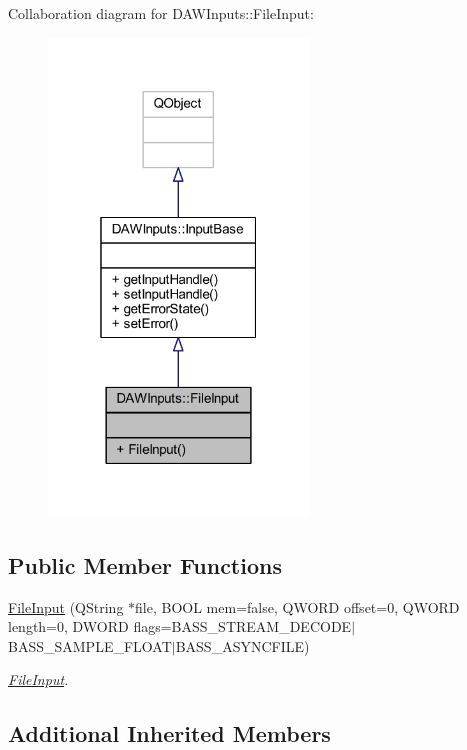 Collaboration diagram for D\-A\-W\-Inputs\-:\-:File\-Input\-:
\nopagebreak
\begin{figure}[H]
\begin{center}
\leavevmode
\includegraphics[width=196pt]{class_d_a_w_inputs_1_1_file_input__coll__graph}
\end{center}
\end{figure}
\subsection*{Public Member Functions}
\begin{DoxyCompactItemize}
\item 
\hyperlink{class_d_a_w_inputs_1_1_file_input_a5a18fa8381fb317541c12ca49d0d1a29_a5a18fa8381fb317541c12ca49d0d1a29}{File\-Input} (Q\-String $\ast$file, B\-O\-O\-L mem=false, Q\-W\-O\-R\-D offset=0, Q\-W\-O\-R\-D length=0, D\-W\-O\-R\-D flags=B\-A\-S\-S\-\_\-\-S\-T\-R\-E\-A\-M\-\_\-\-D\-E\-C\-O\-D\-E$|$B\-A\-S\-S\-\_\-\-S\-A\-M\-P\-L\-E\-\_\-\-F\-L\-O\-A\-T$|$B\-A\-S\-S\-\_\-\-A\-S\-Y\-N\-C\-F\-I\-L\-E)
\begin{DoxyCompactList}\small\item\em \hyperlink{class_d_a_w_inputs_1_1_file_input}{File\-Input}. \end{DoxyCompactList}\end{DoxyCompactItemize}
\subsection*{Additional Inherited Members}


